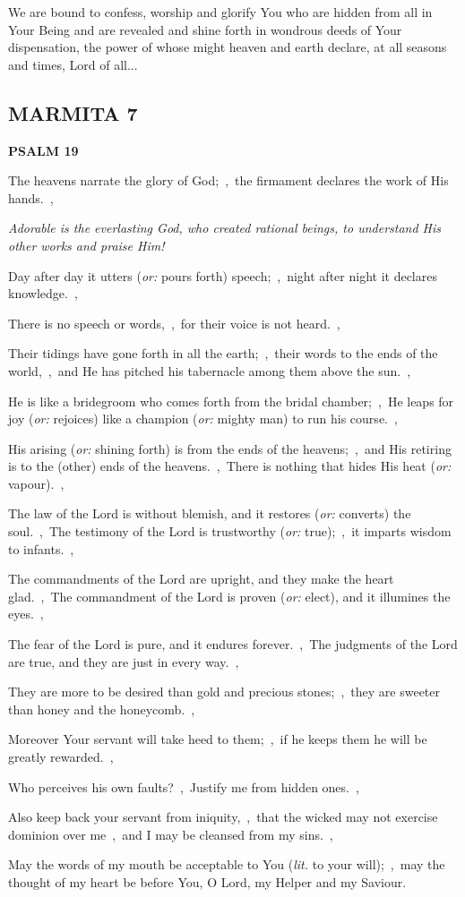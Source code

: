 \documentclass[12pt,twoside,a5paper]{article}
\newcommand{\marmita}[1]{\subsection*{MARMITA {#1}}}
\newcommand{\psalm}[1]{\textbf{PSALM {#1}}}
\newcommand{\qanona}[1]{{\liturgicalhint{Qanona.} \emph{#1}}}
\newcommand{\slota}[1]{\liturgicalhint{Slota.} #1}
\newcommand{\translationoption}[1]{\emph{or:} #1}
\newcommand{\translationliteral}[1]{\emph{lit.} #1}
\begin{document}
\slota{We are bound to confess, worship and glorify You who are hidden from all in Your Being and are revealed and shine forth in wondrous deeds of Your dispensation, the power of whose might heaven and earth declare, at all seasons and times, Lord of all...}

\marmita{7}

\psalm{19}

\begin{normalparskip}
  The heavens narrate the glory of God;~\sep\ the firmament declares the work of His hands.~\sep

  \qanona{Adorable is the everlasting God, who created rational beings, to understand His other works and praise Him!}

  Day after day it utters (\translationoption{pours forth}) speech;~\sep\ night after night it declares knowledge.~\sep

  There is no speech or words,~\sep\ for their voice is not heard.~\sep

  Their tidings have gone forth in all the earth;~\sep\ their words to the ends of the world,~\sep\ and He has pitched his tabernacle among them above the sun.~\sep

  He is like a bridegroom who comes forth from the bridal chamber;~\sep\ He leaps for joy (\translationoption{rejoices}) like a champion (\translationoption{mighty man}) to run his course.~\sep

  His arising (\translationoption{shining forth}) is from the ends of the heavens;~\sep\ and His retiring is to the (other) ends of the heavens.~\sep\ There is nothing that hides His heat (\translationoption{vapour}).~\sep

  The law of the Lord is without blemish, and it restores (\translationoption{converts}) the soul.~\sep\ The testimony of the Lord is trustworthy (\translationoption{true});~\sep\ it imparts wisdom to infants.~\sep

  The commandments of the Lord are upright, and they make the heart glad.~\sep\ The commandment of the Lord is proven (\translationoption{elect}), and it illumines the eyes.~\sep

  The fear of the Lord is pure, and it endures forever.~\sep\ The judgments of the Lord are true, and they are just in every way.~\sep

  They are more to be desired than gold and precious stones;~\sep\ they are sweeter than honey and the honeycomb.~\sep

  Moreover Your servant will take heed to them;~\sep\ if he keeps them he will be greatly rewarded.~\sep

  Who perceives his own faults?~\sep\ Justify me from hidden ones.~\sep

  Also keep back your servant from iniquity,~\sep\ that the wicked may not exercise dominion over me~\sep\ and I may be cleansed from my sins.~\sep

  May the words of my mouth be acceptable to You (\translationliteral{to your will});~\sep\ may the thought of my heart be before You, O Lord, my Helper and my Saviour.
\end{normalparskip}
\end{document}
